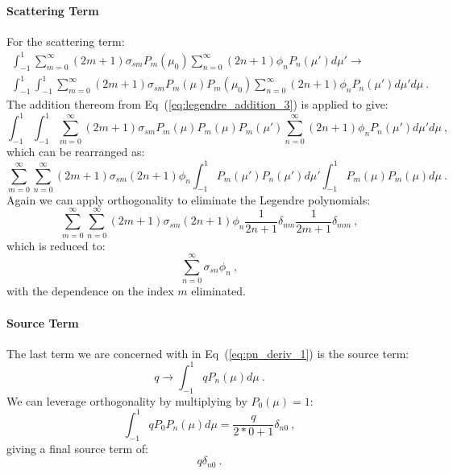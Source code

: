 \paragraph{Scattering Term}
For the scattering term:
\begin{multline}
  \int_{-1}^1 \sum_{m=0}^\infty (2m+1) \sigma_{sm} P_m(\mu_0)
  \sum_{n=0}^\infty (2n+1) \phi_n P_n(\mu') d\mu' \rightarrow\\
  \int_{-1}^1 \int_{-1}^1 \sum_{m=0}^\infty (2m+1) \sigma_{sm} P_m(\mu)
  P_m(\mu_0) \sum_{n=0}^\infty (2n+1) \phi_n P_n(\mu') d\mu' d\mu\:.
  \label{eq:pn_deriv_10}
\end{multline}
The addition thereom from Eq~(\ref{eq:legendre_addition_3}) is applied
to give:
\begin{equation}
  \int_{-1}^1 \int_{-1}^1 \sum_{m=0}^\infty (2m+1) \sigma_{sm} P_m(\mu)
  P_m(\mu)P_m(\mu') \sum_{n=0}^\infty (2n+1) \phi_n P_n(\mu') d\mu' d\mu\:,
  \label{eq:pn_deriv_11}
\end{equation}
which can be rearranged as:
\begin{equation}
  \sum_{m=0}^\infty \sum_{n=0}^\infty (2m+1) \sigma_{sm} (2n+1) \phi_n
  \int_{-1}^1 P_m(\mu') P_n(\mu') d\mu' \int_{-1}^1 P_m(\mu) P_m(\mu)
  d\mu\:.
  \label{eq:pn_deriv_12}
\end{equation}
Again we can apply orthogonality to eliminate the Legendre polynomials:
\begin{equation}
  \sum_{m=0}^\infty \sum_{n=0}^\infty (2m+1) \sigma_{sm} (2n+1) \phi_n
  \frac{1}{2n+1}\delta_{nm}\frac{1}{2m+1}\delta_{mm}\:,
  \label{eq:pn_deriv_13}
\end{equation}
which is reduced to:
\begin{equation}
  \sum_{n=0}^\infty \sigma_{sn} \phi_n\:,
  \label{eq:pn_deriv_14}
\end{equation}
with the dependence on the index $m$ eliminated.

\paragraph{Source Term}
The last term we are concerned with in Eq~(\ref{eq:pn_deriv_1}) is the
source term:
\begin{equation}
  q \rightarrow \int_{-1}^1 q P_n(\mu) d\mu \:.
  \label{eq:pn_deriv_15}
\end{equation}
We can leverage orthogonality by multiplying by $P_0(\mu) = 1$:
\begin{equation}
  \int_{-1}^1 q P_0 P_n(\mu) d\mu = \frac{q}{2*0+1}\delta_{n0}\:,
  \label{eq:pn_deriv_16}
\end{equation}
giving a final source term of:
\begin{equation}
  q\delta_{n0}\:.
  \label{eq:pn_deriv_17}
\end{equation}

